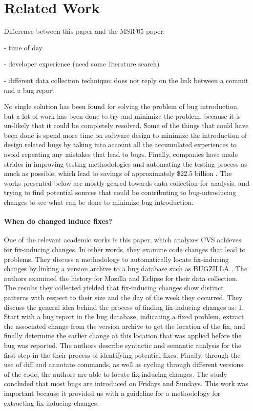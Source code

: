 \section{Related Work}
\label{sec-related}

Difference between this paper and the MSR'05 paper:

- time of day

- developer experience (need some literature search)

- different data collection technique: does not reply on the link between a commit and a bug report




No single solution has been found for solving the problem of bug
introduction, but a lot of work has been done to try and minimize the
problem, because it is un-likely that it could be completely
resolved. Some of the things that could have been done is spend more
time on software design to minimize the introduction of design related
bugs by taking into account all the accumulated experiences to avoid
repeating any mistakes that lead to bugs. Finally, companies have made
strides in improving testing methodologies and automating the testing
process as much as possible, which lead to savings of approximately
\$22.5 billion \cite{2004-industry}. The works presented below are
mostly geared towards data collection for analysis, and trying to find
potential sources that could be contributing to bug-introducing
changes to see what can be done to minimize bug-introduction.

\paragraph{When do changed induce fixes?}


One of the relevant academic works is this paper, which analyzes CVS
achieves for fix-inducing changes. In other words, they examine code
changes that lead to problems. They discuss a methodology to
automatically locate fix-inducing changes by linking a version archive
to a bug database such as BUGZILLA \cite{2005-changes}. The authors
examined the history for Mozilla and Eclipse for their data
collection. The results they collected yielded that fix-inducing
changes show distinct patterns with respect to their size and the day
of the week they occurred. They discuss the general idea behind the
process of finding fix-inducing changes as: 1. Start with a bug report
in the bug database, indicating a fixed problem, extract the
associated change from the version archive to get the location of the
fix, and finally determine the earlier change at this location that
was applied before the bug was reported. The authors describe
syntactic and semantic analysis for the first step in the their
process of identifying potential fixes. Finally, through the use of
diff and annotate commands, as well as cycling through different
versions of the code, the authors are able to locate fix-inducing
changes. The study concluded that most bugs are introduced on Fridays
and Sundays. This work was important because it provided us with a
guideline for a methodology for extracting fix-inducing changes.

